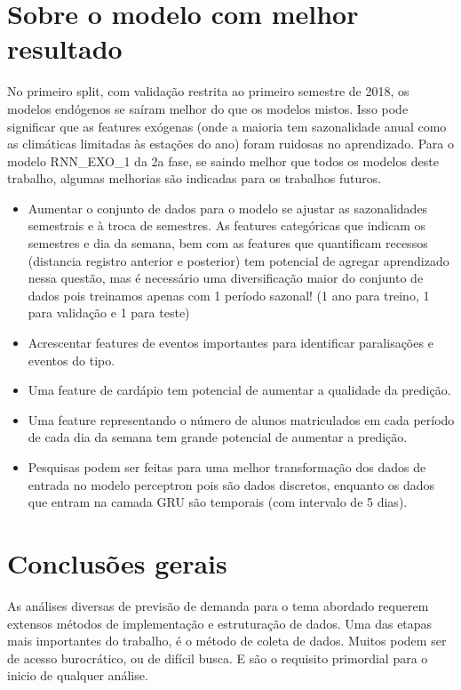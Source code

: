 \documentclass[	12pt, Times, openright, twoside, a4paper, english, brazil]{abntex2}
\begin{document}
    \section{Sobre o modelo com melhor resultado}
        No primeiro split, com validação restrita ao primeiro semestre de 2018, os modelos endógenos se saíram melhor do que os modelos mistos. Isso pode significar que as features exógenas (onde a maioria tem sazonalidade anual como as climáticas limitadas às estações do ano) foram ruidosas no aprendizado.
        Para o modelo RNN\_EXO\_1 da 2a fase, se saindo melhor que todos os modelos deste trabalho, algumas melhorias são indicadas para os trabalhos futuros.\newline
        \begin{itemize}
            \item Aumentar o conjunto de dados para o modelo se ajustar as sazonalidades semestrais e à troca de semestres. As features categóricas que indicam os semestres e dia da semana, bem com as features que quantificam recessos (distancia registro anterior e posterior) tem potencial de agregar aprendizado nessa questão, mas é necessário uma diversificação maior do conjunto de dados pois treinamos apenas com 1 período sazonal! (1 ano para treino, 1 para validação e 1 para teste)
            \item Acrescentar features de eventos importantes para identificar paralisações e eventos do tipo.
            \item Uma feature de cardápio tem potencial de aumentar a qualidade da predição.
            \item Uma feature representando o número de alunos matriculados em cada período de cada dia da semana tem grande potencial de aumentar a predição.
            \item Pesquisas podem ser feitas para uma melhor transformação dos dados de entrada no modelo perceptron pois são dados discretos, enquanto os dados que entram na camada GRU são temporais (com intervalo de 5 dias).
        \end{itemize}
        
    \section{Conclusões gerais}
         As análises diversas de previsão de demanda para o tema abordado requerem extensos métodos de implementação e estruturação de dados.
        Uma das etapas mais importantes do trabalho, é o método de coleta de dados. Muitos podem ser de acesso burocrático, ou de difícil busca. E são o requisito primordial para o inicio de qualquer análise.
        
\end{document}
